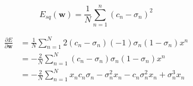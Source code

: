 \documentclass[fleqn]{report}
\renewcommand{\vec}[1]{\mathbf{#1}}
\begin{document}
\begin{equation}
    E_{sq} (\vec{w}) =
    \frac{1}{N} \sum_{n=1}^n
    \left( c_n - \sigma_n \right) ^ 2
\end{equation}

\begin{equation}
    \begin{split}
        \frac{\partial E}{\partial \vec{w}} & =
        \frac{1}{N} \sum_{n=1}^{N}
        2 (c_n - \sigma_n) (-1) \sigma_n (1 - \sigma_n) x^n \\
        & = - \frac{2}{N} \sum_{n=1}^{N}
        (c_n - \sigma_n) \sigma_n (1 - \sigma_n) x^n \\
        & = - \frac{2}{N} \sum_{n=1}^{N}
        x_n c_n \sigma_n - \sigma_n^2 x_n - c_n \sigma_n^2 x_n + \sigma_n^3 x_n
    \end{split}
\end{equation}
\end{document}
